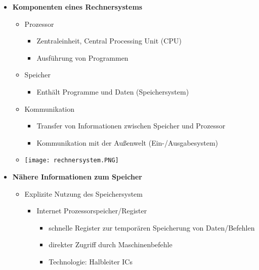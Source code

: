 \begin{itemize}
        \item \textbf{Komponenten eines Rechnersystems}
            \begin{itemize}
                \item Prozessor
                    \begin{itemize}
                        \item Zentraleinheit, Central Processing Unit (CPU)
                        \item Ausführung von Programmen
                    \end{itemize}
                \item Speicher
                    \begin{itemize}
                        \item Enthält Programme und Daten (Speichersystem)
                    \end{itemize}
                \item Kommunikation
                    \begin{itemize}
                        \item Transfer von Informationen zwischen Speicher und Prozessor
                        \item Kommunikation mit der Außenwelt (Ein-/Ausgabesystem)
                    \end{itemize}
                \item[] \texttt{[image: rechnersystem.PNG]}
            \end{itemize}

        \item \textbf{Nähere Informationen zum Speicher} 
            \begin{itemize}
                \item Explizite Nutzung des Speichersystem
                    \begin{itemize}
                        \item Internet Prozessorspeicher/Register
                            \begin{itemize}
                                \item schnelle Register zur temporären Speicherung von Daten/Befehlen
                                \item direkter Zugriff durch Maschinenbefehle
                                \item Technologie: Halbleiter ICs
                            \end{itemize}
                        

\end{itemize}
\end{itemize}
\end{itemize}
